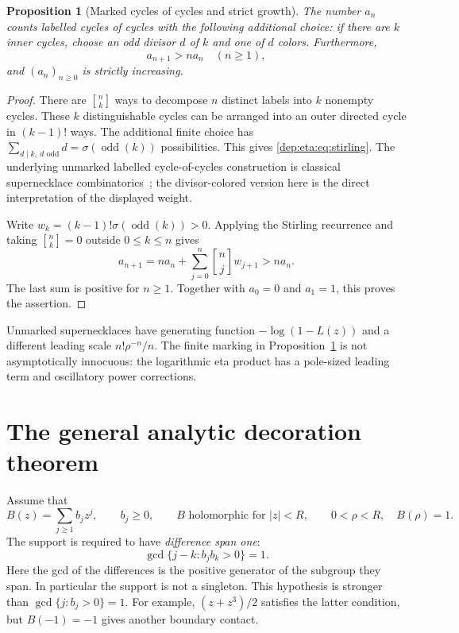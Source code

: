 \documentclass[11pt]{article}
\newtheorem{proposition}[theorem]{Proposition}
\theoremstyle{definition}\newtheorem{definition}[theorem]{Definition}
\theoremstyle{remark}\newtheorem{remark}[theorem]{Remark}
\newcommand{\odd}{\operatorname{odd}}
\newcommand{\stir}[2]{\genfrac{[}{]}{0pt}{}{#1}{#2}}
\begin{document}
\begin{proposition}[Marked cycles of cycles and strict growth]\label{dep:eta:prop:counts}
The number $a_n$ counts labelled cycles of cycles with the following
additional choice: if there are $k$ inner cycles, choose an odd divisor
$d$ of $k$ and one of $d$ colors. Furthermore,
\begin{equation}\label{dep:eta:eq:monotone}
 a_{n+1}>n a_n\quad(n\ge1),
\end{equation}
and $(a_n)_{n\ge0}$ is strictly increasing.
\end{proposition}
\begin{proof}
There are $\stir nk$ ways to decompose $n$ distinct labels into $k$
nonempty cycles. These $k$ distinguishable cycles can be arranged into
an outer directed cycle in $(k-1)!$ ways. The additional finite choice
has $\sum_{d\mid k,\ d\text{ odd}}d=\sigma(\odd(k))$ possibilities.
This gives \eqref{dep:eta:eq:stirling}. The underlying unmarked labelled
cycle-of-cycles construction is classical supernecklace
combinatorics~\cite{supernecklace,ac}; the divisor-colored version here
is the direct interpretation of the displayed weight.

Write $w_k=(k-1)!\sigma(\odd(k))>0$. Applying the Stirling recurrence
and taking $\stir nk=0$ outside $0\le k\le n$ gives
\[
 a_{n+1}=n a_n+\sum_{j=0}^n\stir nj w_{j+1}>n a_n.
\]
The last sum is positive for $n\ge1$. Together with $a_0=0$ and
$a_1=1$, this proves the assertion.
\end{proof}

Unmarked supernecklaces have generating function $-\log(1-L(z))$
and a different leading scale $n!\rho^{-n}/n$. The finite marking in
Proposition~\ref{dep:eta:prop:counts} is not asymptotically innocuous: the
logarithmic eta product has a pole-sized leading term and oscillatory
power corrections.

\section{The general analytic decoration theorem}\label{dep:eta:sec:general}
Assume that
\begin{equation}\label{dep:eta:eq:Bassump}
 B(z)=\sum_{j\ge1}b_jz^j,\qquad b_j\ge0,
 \qquad B\text{ holomorphic for }|z|<R,
 \qquad 0<\rho<R,\quad B(\rho)=1.
\end{equation}
The support is required to have \emph{difference span one}:
\begin{equation}\label{dep:eta:eq:span}
 \gcd\{j-k:b_jb_k>0\}=1.
\end{equation}
Here the gcd of the differences is the positive generator of the
subgroup they span. In particular the support is not a singleton.
This hypothesis is stronger than $\gcd\{j:b_j>0\}=1$.
For example, $(z+z^3)/2$ satisfies the latter condition, but
$B(-1)=-1$ gives another boundary contact.
\end{document}
